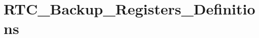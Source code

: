 \hypertarget{group___r_t_c___backup___registers___definitions}{\section{R\-T\-C\-\_\-\-Backup\-\_\-\-Registers\-\_\-\-Definitions}
\label{group___r_t_c___backup___registers___definitions}
}
